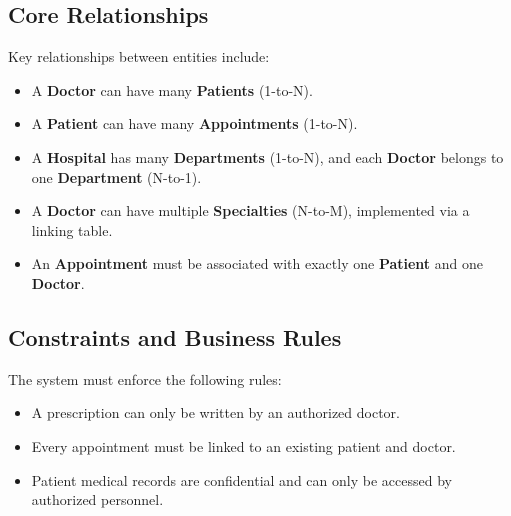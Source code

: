 \subsection{Core Relationships}
Key relationships between entities include:
\begin{itemize}
    \item A \textbf{Doctor} can have many \textbf{Patients} (1-to-N).
    \item A \textbf{Patient} can have many \textbf{Appointments} (1-to-N).
    \item A \textbf{Hospital} has many \textbf{Departments} (1-to-N), and each \textbf{Doctor} belongs to one \textbf{Department} (N-to-1).
    \item A \textbf{Doctor} can have multiple \textbf{Specialties} (N-to-M), implemented via a linking table.
    \item An \textbf{Appointment} must be associated with exactly one \textbf{Patient} and one \textbf{Doctor}.
\end{itemize}

\subsection{Constraints and Business Rules}
The system must enforce the following rules:
\begin{itemize}
    \item A prescription can only be written by an authorized doctor.
    \item Every appointment must be linked to an existing patient and doctor.
    \item Patient medical records are confidential and can only be accessed by authorized personnel.
\end{itemize}
